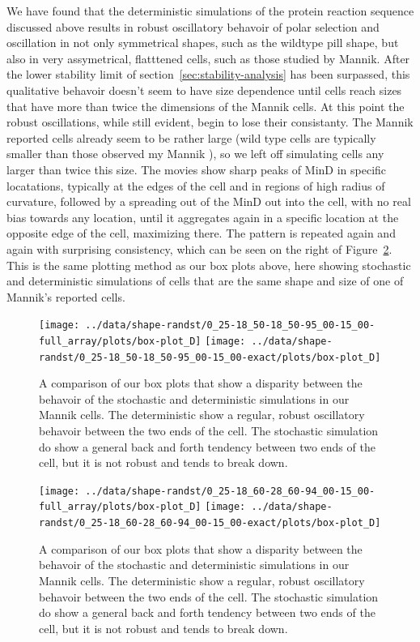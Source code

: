 \documentclass[letterpaper,twocolumn,amsmath,amssymb,pre]{revtex4-1}
\begin{document}
We have found that the deterministic simulations of the protein
reaction sequence discussed above results in robust oscillatory
behavoir of polar selection and oscillation in not only symmetrical
shapes, such as the wildtype pill shape, but also in very
assymetrical, flatttened cells, such as those studied by Mannik.
After the lower stability limit of
section~\ref{sec:stability-analysis} has been surpassed, this
qualitative behavoir doesn't seem to have size dependence until cells
reach sizes that have more than twice the dimensions of the Mannik
cells.  At this point the robust oscillations, while still evident,
begin to lose their consistanty.  The Mannik reported cells already
seem to be rather large (wild type cells are typically smaller than
those observed my Mannik
\cite{kubitschek1990cell,kubitschek1968linear,mannik2012robustness}),
so we left off simulating cells any larger than twice this size. The
movies show sharp peaks of MinD in specific locatations, typically at
the edges of the cell and in regions of high radius of curvature,
followed by a spreading out of the MinD out into the cell, with no
real bias towards any location, until it aggregates again in a
specific location at the opposite edge of the cell, maximizing there.
The pattern is repeated again and again with surprising consistency,
which can be seen on the right of Figure~\ref{box-mannik}.  This is
the same plotting method as our box plots above, here showing
stochastic and deterministic simulations of cells that are the same
shape and size of one of Mannik's reported cells.

\begin{figure}
  \texttt{[image: ../data/shape-randst/0\_25-18\_50-18\_50-95\_00-15\_00-full\_array/plots/box-plot\_D]}
  \texttt{[image: ../data/shape-randst/0\_25-18\_50-18\_50-95\_00-15\_00-exact/plots/box-plot\_D]}
  \caption{A comparison of our box plots that show a disparity between
    the behavoir of the stochastic and deterministic simulations in
    our Mannik cells.  The deterministic show a regular, robust
    oscillatory behavoir between the two ends of the cell. The
    stochastic simulation do show a general back and forth tendency
    between two ends of the cell, but it is not robust and tends to
    break down.}
  \label{box-mannik}
\end{figure}
\begin{figure}
  \texttt{[image: ../data/shape-randst/0\_25-18\_60-28\_60-94\_00-15\_00-full\_array/plots/box-plot\_D]}
  \texttt{[image: ../data/shape-randst/0\_25-18\_60-28\_60-94\_00-15\_00-exact/plots/box-plot\_D]}
  \caption{A comparison of our box plots that show a disparity between
    the behavoir of the stochastic and deterministic simulations in
    our Mannik cells.  The deterministic show a regular, robust
    oscillatory behavoir between the two ends of the cell. The
    stochastic simulation do show a general back and forth tendency
    between two ends of the cell, but it is not robust and tends to
    break down.}
  \label{box-mannik}
\end{figure}
\end{document}
